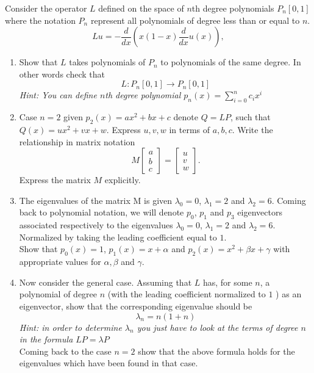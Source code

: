Consider the operator $L$ defined on the space of $n$th degree polynomials $P_n[0,1]$ where the notation $P_n$ represent all polynomials
of degree less than or equal to $n$. 
\[
Lu =  - \frac{d}{dx} \left( x(1-x) \frac{d}{dx} u(x) \right) ,
\]
\begin{enumerate}
\item Show that $L$ takes polynomials of $P_n$ to polynomials
of the same degree. In other words check that 
\[
L: P_n [0,1] \rightarrow P_n [0,1]
\]
\emph{Hint: You can define $n$th degree polynomial $p_n(x)= \sum_{i=0}^n c_i x^i$}

\item Case $n=2$ given $p_2(x)= a x^2 +b x + c$ denote $Q= LP$, such that $Q(x)= u x^2 + v x + w$.
Express $ u, v, w$ in terms of $a, b, c$. Write the relationship in matrix notation 
\[
M \left[\begin{array}{c} a \\ b \\ c \end{array}\right] =\left[\begin{array}{c} u \\ v \\ w \end{array}\right].
\]
Express the matrix $M$ explicitly.

\item The eigenvalues of the matrix M is given $\lambda_0 = 0$, $\lambda_1 = 2$ and $\lambda_2 = 6$. Coming
back to polynomial notation, we will denote $p_0$, $p_1$ and $p_3$ eigenvectors associated
respectively to the eigenvalues $\lambda_0 = 0$, $\lambda_1 = 2$ and $\lambda_2 = 6$. Normalized by taking the leading coefficient equal to $1$.\\

Show that $p_0(x)=1$, $p_1(x)= x+\alpha$ and $p_2(x)= x^2+ \beta x +\gamma$ with appropriate values for $\alpha, \beta$ and $\gamma$.

\item Now consider the general case. Assuming that $L$ has, for some $n$, a polynomial of degree $n$ (with
the leading coefficient normalized to $1$	) as an eigenvector, show that the corresponding
eigenvalue should be
\[
\lambda_n = n (1+n)
\]
\emph{Hint: in order to determine $\lambda_n$ you just have to look at the terms of degree $n$ in the
formula $LP=\lambda P$}\\
Coming back to the case $n=2$ show that the above formula holds for the eigenvalues which have been found in that case.

\end{enumerate}
